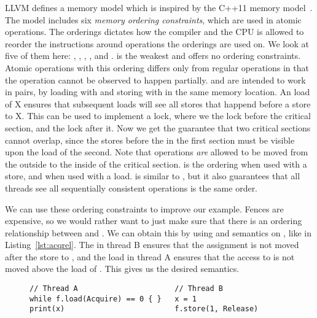 \documentclass[b5paper]{report}
\begin{document}
LLVM defines a memory model which is inspired by the C++11 memory
model~\cite{llvmmm}. The model includes six \emph{memory ordering constraints},
which are used in atomic operations. The orderings dictates how the compiler and
the CPU is allowed to reorder the instructions around operations the orderings
are used on.  We look at five of them here: , ,
, , and .   is the
weakest and offers no ordering constraints. Atomic operations with this ordering
differs only from regular operations in that the operation cannot be observed to
happen partially.   and  are intended to work in
pairs, by loading with  and storing with  in the
same memory location.  An  load of X ensures that subsequent loads
will see all stores that happend before a  store to X.  This can
be used to implement a lock, where we  the lock before the
critical section, and  the lock after it.  Now we get the
guarantee that two critical sections cannot overlap, since the stores before the
 in the first section must be visible upon the 
load of the second. Note that operations \emph{are} allowed to be moved from the
outside to the inside of the critical section.  is the
 ordering when used with a store, and  when used
with a load.  is similar to , but it also
guarantees that all threads see all sequentially consistent operations is the
same order.

We can use these ordering constraints to improve our example. Fences are
expensive, so we would rather want to just make sure that there is an ordering
relationship between  and . We can obtain this by using
 and  semantics on , like in
Listing~\ref{lst:acqrel}. The  in thread B ensures that the
assignment  is not moved after the store to , and the
 load in thread A ensures that the access to  is not moved
above the load of . This gives us the desired semantics.

\begin{figure}[ht]
\begin{lstlisting}[caption=Synchronization using orderings,label=lst:acqrel]
// Thread A                      // Thread B
while f.load(Acquire) == 0 { }   x = 1
print(x)                         f.store(1, Release)
\end{lstlisting}
\end{figure}
\end{document}

